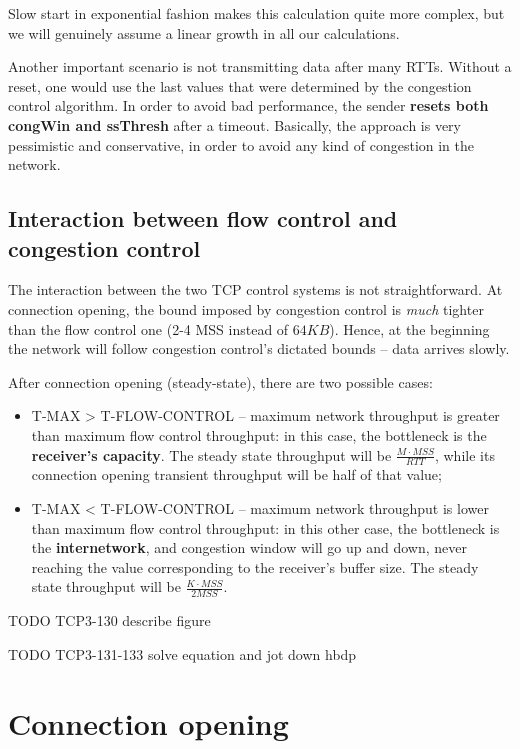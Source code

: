 \documentclass[a4paper, 11pt]{report}
\begin{document}
Slow start in exponential fashion makes this calculation quite more complex,
but we will genuinely assume a linear growth in all our calculations.

Another important scenario is not transmitting data after many RTTs. Without a
reset, one would use the last values that were determined by the congestion
control algorithm. In order to avoid bad performance, the sender \textbf{resets
both congWin and ssThresh} after a timeout. Basically, the approach is very
pessimistic and conservative, in order to avoid any kind of congestion in the
network.

\section{Interaction between flow control and congestion control}

The interaction between the two TCP control systems is not straightforward. At
connection opening, the bound imposed by congestion control is \emph{much}
tighter than the flow control one (2-4 MSS instead of $64KB$). Hence, at the
beginning the network will follow congestion control's dictated bounds \---
data arrives slowly.

After connection opening (steady-state), there are two possible cases:
\begin{itemize}
    \item T-MAX > T-FLOW-CONTROL \--- maximum network throughput is greater
        than maximum flow control throughput: in this case, the bottleneck is
        the \textbf{receiver's capacity}. The steady state throughput will be
        $\frac{M\cdot MSS}{RTT}$, while its connection opening transient
        throughput will be half of that value;
    \item T-MAX < T-FLOW-CONTROL \--- maximum network throughput is lower
        than maximum flow control throughput: in this other case, the
        bottleneck is the \textbf{internetwork}, and congestion window will go
        up and down, never reaching the value corresponding to the receiver's
        buffer size. The steady state throughput will be $\frac{K\cdot
        MSS}{2MSS}$.
\end{itemize}

TODO TCP3-130 describe figure

TODO TCP3-131-133 solve equation and jot down hbdp

\chapter{Connection opening}
\end{document}
